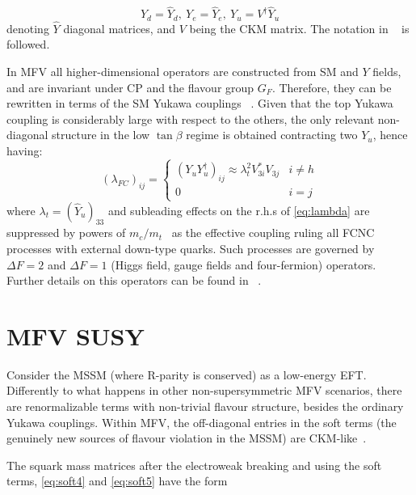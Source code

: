 \begin{equation}
Y_d = \hat{Y}_d, \ Y_e = \hat{Y}_e, \ Y_u = V^{\dagger}\hat{Y}_u
\end{equation}
denoting $\hat{Y}$ diagonal matrices, and $V$ being the CKM matrix. The notation in ~\cite{DAmbrosio:2002vsn} is followed.  

In MFV all higher-dimensional operators are constructed from SM and $Y$ fields, and are invariant under CP and the flavour group $G_F$. Therefore, they can be rewritten in terms of the SM Yukawa couplings ~\cite{Altmannshofer:2007cs}. Given that the top Yukawa coupling is considerably large with respect to the others, the only relevant non-diagonal structure in the low $\tan{\beta}$ regime is obtained contracting two $Y_u$, hence having:
\begin{equation}
\left(\lambda_{FC}\right)_{ij} = \left\{\begin{matrix}
\left( Y_u Y_u^{\dagger} \right)_{ij} \approx \lambda_t^2 V_{3i}^* V_{3j} & i \neq h\\ 
0 & i = j 
\end{matrix}\right.
\label{eq:lambda}
\end{equation}
where $\lambda_t = (\hat{Y}_u)_{33}$ and subleading effects on the r.h.s of \ref{eq:lambda} are suppressed by powers of $m_c/m_t$~\cite{Altmannshofer:2007cs} as the effective coupling ruling all FCNC processes with external down-type quarks. Such processes are governed by $\Delta F = 2$ and $\Delta F = 1$ (Higgs field, gauge fields and four-fermion) operators. Further details on this operators can be found in ~\cite{DAmbrosio:2002vsn}. 



\section{MFV SUSY}
\label{sec:MFVSUSY}
Consider the MSSM (where R-parity is conserved) as a low-energy EFT. Differently to what happens in other non-supersymmetric MFV scenarios, there are renormalizable terms with non-trivial flavour structure, besides the ordinary Yukawa couplings.
Within MFV, the off-diagonal entries in the soft terms (the genuinely new sources of flavour violation in the MSSM) are CKM-like~\cite{Altmannshofer:2007cs}.

The squark mass matrices after the electroweak breaking and using the soft terms, \ref{eq:soft4} and \ref{eq:soft5} have the form 

